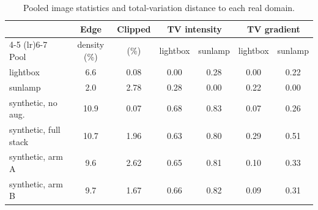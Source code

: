 \begin{table}[ht]
  \caption{Pooled image statistics and total-variation distance to each real domain.}
  \label{tab:imagestats}
  \centering
  \small
  \begin{tabular}{l cc cc cc}
    \toprule
    & Edge & Clipped & \multicolumn{2}{c}{TV intensity} & \multicolumn{2}{c}{TV gradient} \\
    \cmidrule(lr){4-5} \cmidrule(lr){6-7}
    Pool & density (\%) & (\%) & lightbox & sunlamp & lightbox & sunlamp \\
    \midrule
    lightbox & 6.6 & 0.08 & 0.00 & 0.28 & 0.00 & 0.22 \\
    sunlamp & 2.0 & 2.78 & 0.28 & 0.00 & 0.22 & 0.00 \\
    synthetic, no aug. & 10.9 & 0.07 & 0.68 & 0.83 & 0.07 & 0.26 \\
    synthetic, full stack & 10.7 & 1.96 & 0.63 & 0.80 & 0.29 & 0.51 \\
    synthetic, arm A & 9.6 & 2.62 & 0.65 & 0.81 & 0.10 & 0.33 \\
    synthetic, arm B & 9.7 & 1.67 & 0.66 & 0.82 & 0.09 & 0.31 \\
    \bottomrule
  \end{tabular}
\end{table}
